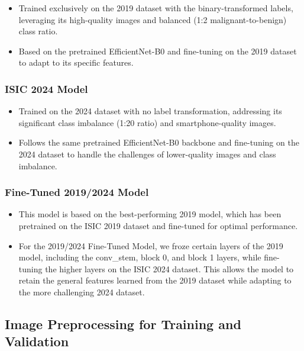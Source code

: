 \documentclass{article}
\begin{document}
\begin{itemize}

\item Trained exclusively on the 2019 dataset with the binary-transformed labels, leveraging its high-quality
images and balanced (1:2 malignant-to-benign) class ratio.
\item Based on the pretrained EfficientNet-B0 and fine-tuning on the 2019 dataset to adapt to its specific features.

\end{itemize}

\subsubsection{ISIC 2024 Model}

\begin{itemize}

\item Trained on the 2024 dataset with no label transformation, addressing its significant class imbalance
(1:20 ratio) and smartphone-quality images.
\item Follows the same pretrained EfficientNet-B0 backbone and fine-tuning on the
2024 dataset to handle the challenges of lower-quality images and class imbalance.

\end{itemize}

\subsubsection{Fine-Tuned 2019/2024 Model}

\begin{itemize}

\item This model is based on the best-performing 2019 model, which has been pretrained on the ISIC 2019
dataset and fine-tuned for optimal performance.
\item For the 2019/2024 Fine-Tuned Model, we froze certain layers of the 2019 model, including the
conv\_stem, block 0, and block 1 layers, while fine-tuning the higher layers on the ISIC 2024 dataset.
This allows the model to retain the general features learned from the 2019 dataset while adapting to the
more challenging 2024 dataset.

\end{itemize}

\subsection{Image Preprocessing for Training and Validation}
\end{document}
